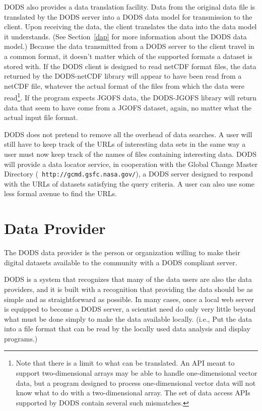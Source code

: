 DODS also provides a data translation facility. Data from the original
data file is translated by the DODS server into a DODS data model for
transmission to the client. Upon receiving the data, the client
translates the data into the data model it understands. (See
Section~\ref{dap} for more information about the DODS data model.)
Because the data transmitted from a DODS server to the client travel
in a common format, it doesn't matter which of the supported formats a
dataset is stored with. If the DODS client is designed to read netCDF
format files, the data returned by the DODS-netCDF library will appear
to have been read from a netCDF file, whatever the actual format of
the files from which the data were read\footnote{Note that there is a
limit to what can be translated. An API meant to support
two-dimensional arrays may be able to handle one-dimensional vector
data, but a program designed to process one-dimensional vector data
will not know what to do with a two-dimensional array. The set of data
access APIs supported by DODS contain several such mismatches.}. If
the program expects JGOFS data, the DODS-JGOFS library will return
data that seem to have come from a JGOFS dataset, again, no matter
what the actual input file format.

DODS does not pretend to remove all the overhead of data searches. A
user will still have to keep track of the URLs of interesting data
sets in the same way a user must now keep track of the names of files
containing interesting data. DODS will provide a data locator service,
in cooperation with the Global Change Master Directory ({\tt
http://gcmd.gsfc.nasa.gov/}), a DODS server designed to respond with
the URLs of datasets satisfying the query criteria. A user
can also use some less formal avenue to find the URLs.

\section{Data Provider}

The DODS data provider is the person or organization willing to make
their digital datasets available to the community with a DODS
compliant server.

DODS is a system that recognizes that many of the data users are also
the data providers, and it is built with a recognition that providing
the data should be as simple and as straightforward as possible. In
many cases, once a local web server is equipped to become a DODS
server, a scientist need do only very little beyond what must be done
simply to make the data available locally. (i.e., Put the data into
a file format that can be read by the locally used data analysis and
display programs.)


